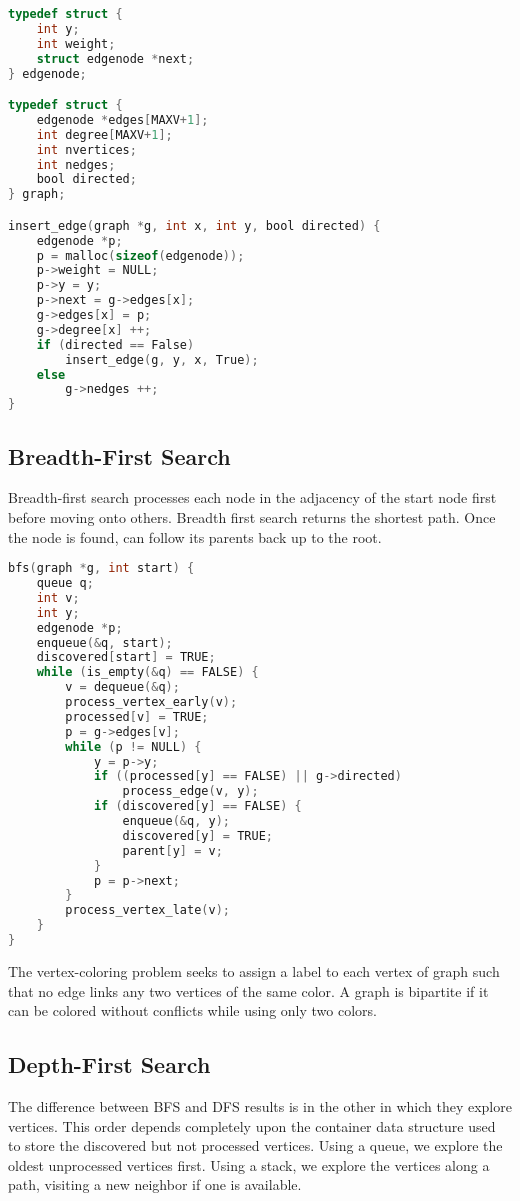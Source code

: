 \documentclass[10pt]{article}
\theoremstyle{definition}
\begin{document}
\begin{lstlisting}[language=C]
typedef struct {
    int y;
    int weight;
    struct edgenode *next;
} edgenode;

typedef struct {
    edgenode *edges[MAXV+1];
    int degree[MAXV+1];
    int nvertices;
    int nedges;
    bool directed;
} graph;

insert_edge(graph *g, int x, int y, bool directed) {
    edgenode *p;
    p = malloc(sizeof(edgenode));
    p->weight = NULL;
    p->y = y;
    p->next = g->edges[x];
    g->edges[x] = p;
    g->degree[x] ++;
    if (directed == False)
        insert_edge(g, y, x, True);
    else
        g->nedges ++;
}
\end{lstlisting}

\subsection{Breadth-First Search}
Breadth-first search processes each node in the adjacency of the start node first before moving onto others. Breadth first search returns the shortest path. Once the node is found, can follow its parents back up to the root.
\begin{lstlisting}[language=C]
bfs(graph *g, int start) {
    queue q;
    int v;
    int y;
    edgenode *p;
    enqueue(&q, start);
    discovered[start] = TRUE;
    while (is_empty(&q) == FALSE) {
        v = dequeue(&q);
        process_vertex_early(v);
        processed[v] = TRUE;
        p = g->edges[v];
        while (p != NULL) {
            y = p->y;
            if ((processed[y] == FALSE) || g->directed)
                process_edge(v, y);
            if (discovered[y] == FALSE) {
                enqueue(&q, y);
                discovered[y] = TRUE;
                parent[y] = v;
            }
            p = p->next;
        }
        process_vertex_late(v);
    }
}
\end{lstlisting}
The vertex-coloring problem seeks to assign a label to each vertex of graph such that no edge links any two vertices of the same color. A graph is bipartite if it can be colored without conflicts while using only two colors.

\subsection{Depth-First Search}
The difference between BFS and DFS results is in the other in which they explore vertices. This order depends completely upon the container data structure used to store the discovered but not processed vertices. Using a queue, we explore the oldest unprocessed vertices first. Using a stack, we explore the vertices along a path, visiting a new neighbor if one is available.
\end{document}
